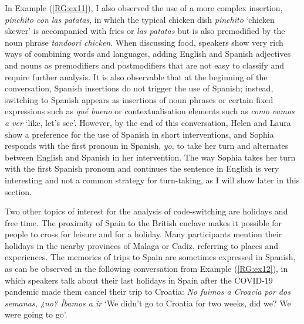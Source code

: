 \documentclass[output=paper]{langscibook}
\begin{document}
In Example (\ref{RG:ex11}), I also observed the use of a more complex insertion, \textit{pinchito con las patatas}, in which the typical chicken dish \textit{pinchito} ‘chicken skewer’ is accompanied with fries or \textit{las patatas} but is also premodified by the noun phrase \textit{tandoori chicken}. When discussing food, speakers show very rich ways of combining words and languages, adding English and Spanish adjectives and nouns as premodifiers and postmodifiers that are not easy to classify and require further analysis. It is also observable that at the beginning of the conversation, Spanish insertions do not trigger the use of Spanish; instead, switching to Spanish appears as insertions of noun phrases or certain fixed expressions such as \textit{qué bueno} or contextualisation elements such as \textit{como vamos a ver} ‘like, let’s see’. However, by the end of this conversation, Helen and Laura show a preference for the use of Spanish in short interventions, and Sophia responds with the first pronoun in Spanish, \textit{yo}, to take her turn and alternates between English and Spanish in her intervention. The way Sophia takes her turn with the first Spanish pronoun and continues the sentence in English is very interesting and not a common strategy for turn-taking, as I will show later in this section.

Two other topics of interest for the analysis of code-switching are holidays and free time. The proximity of Spain to the British enclave makes it possible for people to cross for leisure and for a holiday. Many participants mention their holidays in the nearby provinces of Malaga or Cadiz, referring to places and experiences. The memories of trips to Spain are sometimes expressed in Spanish, as can be observed in the following conversation from Example (\ref{RG:ex12}), in which speakers talk about their last holidays in Spain after the COVID-19 pandemic made them cancel their trip to Croatia: \textit{No fuimos a Croacia por dos semanas, ¿no? Íbamos a ir} ‘We didn’t go to Croatia for two weeks, did we? We were going to go’.
\end{document}
